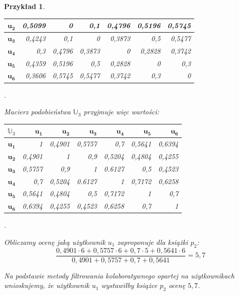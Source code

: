 \documentclass[12pt,a4paper]{report}
\newtheorem{przyklad}{Przykład}[chapter]
\begin{document}
\begin{przyklad}
\begin{center}
\begin{tabular}{|r|r|r|r|r|r|r|}
\hline
$\mathbf{u_2}$ & 0,5099 & 0 & 0,1 & 0,4796 & 0,5196 & 0,5745 \\
\hline
$\mathbf{u_3}$ & 0,4243 & 0,1 & 0 & 0,3873 & 0,5 & 0,5477 \\
\hline
$\mathbf{u_4}$ & 0,3 & 0,4796 & 0,3873 & 0 & 0,2828 & 0,3742 \\ 
\hline 
$\mathbf{u_5}$ & 0,4359 & 0,5196 & 0,5 & 0,2828 & 0 & 0,3 \\
\hline 
$\mathbf{u_6}$ & 0,3606 & 0,5745 & 0,5477 & 0,3742 & 0,3 & 0 \\ 
\hline 
\end{tabular}.
\end{center}
Macierz podobieństwa $\mathbb{U}_3$ przyjmuje więc wartości:
\begin{center}
\begin{tabular}{|r|r|r|r|r|r|r|} \hline
$\mathbb{U}_3$ & $\mathbf{u_1}$ & $\mathbf{u_2}$ & $\mathbf{u_3}$ & $\mathbf{u_4}$ & $\mathbf{u_5}$ & $\mathbf{u_6}$ \\
\hline
$\mathbf{u_1}$ & 1 & 0,4901 & 0,5757 & 0,7 & 0,5641 & 0,6394 \\
\hline
$\mathbf{u_2}$ & 0,4901 & 1 & 0,9 & 0,5204 & 0,4804 & 0,4255 \\
\hline
$\mathbf{u_3}$ & 0,5757 & 0,9 & 1 & 0.6127 & 0,5 & 0,4523 \\
\hline
$\mathbf{u_4}$ & 0,7 & 0,5204 & 0.6127 & 1 & 0,7172 & 0,6258 \\ 
\hline 
$\mathbf{u_5}$ & 0,5641 & 0,4804 & 0,5 & 0,7172 & 1 & 0,7 \\
\hline 
$\mathbf{u_6}$ & 0,6394 & 0,4255 & 0,4523 & 0,6258 & 0,7 & 1 \\ 
\hline 
\end{tabular}.
\end{center}
Obliczamy ocenę jaką użytkownik $u_1$ zaproponuje dla książki $p_2$:
$$
\frac{0,4901 \cdot 6 + 0,5757 \cdot 6 + 0,7 \cdot 5 + 0,5641 \cdot 6}{0,4901 + 0,5757  + 0,7  + 0,5641} = 5,7
$$

Na podstawie metody filtrowania kolaboratywnego opartej na użytkownikach wnioskujemy, że użytkownik $u_1$ wystawiłby książce $p_2$ ocenę $5,7$.


\end{przyklad}
\end{document}
